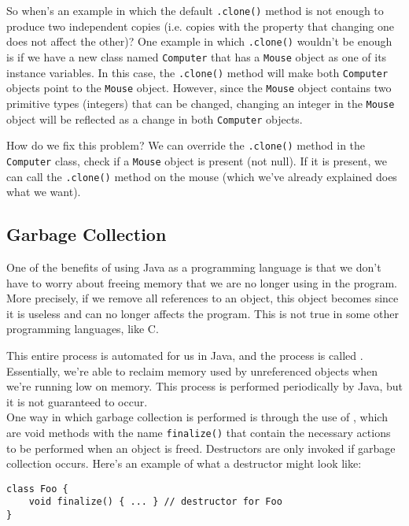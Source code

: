 So when's an example in which the default \verb!.clone()! method is not enough to produce two independent copies (i.e. copies with the property that changing one does not affect the other)? One example in which \verb!.clone()! wouldn't be enough is if we have a new class named \verb!Computer! that has a \verb!Mouse! object as one of its instance variables. In this case, the \verb!.clone()! method will make both \verb!Computer! objects point to the \verb!Mouse! object. However, since the \verb!Mouse! object contains two primitive types (integers) that can be changed, changing an integer in the \verb!Mouse! object will be reflected as a change in both \verb!Computer! objects. 

How do we fix this problem? We can override the \verb!.clone()! method in the \verb!Computer! class, check if a \verb!Mouse! object is present (not null). If it is present, we can call the \verb!.clone()! method on the mouse (which we've already explained does what we want). 

\subsection{Garbage Collection}
One of the benefits of using Java as a programming language is that we don't have to worry about freeing memory that we are no longer using in the program. More precisely, if we remove all references to an object, this object becomes  since it is useless and can no longer affects the program. This is not true in some other programming languages, like C.

This entire process is automated for us in Java, and the process is called . Essentially, we're able to reclaim memory used by unreferenced objects when we're running low on memory. This process is performed periodically by Java, but it is not guaranteed to occur. \\

One way in which garbage collection is performed is through the use of , which are void methods with the name \verb!finalize()! that contain the necessary actions to be performed when an object is freed. Destructors are only invoked if garbage collection occurs. Here's an example of what a destructor might look like:

\begin{lstlisting}
class Foo {
    void finalize() { ... } // destructor for Foo
}
\end{lstlisting}
